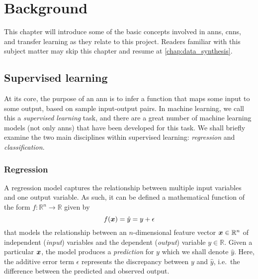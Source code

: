 \documentclass[../report.tex]{subfiles}
\begin{document}
\chapter{Background}
This chapter will introduce some of the basic concepts involved in \glspl{ann}, \glspl{cnn}, and transfer learning as they relate to this project.
Readers familiar with this subject matter may skip this chapter and resume at \cref{chap:data_synthesis}.

\section{Supervised learning}
At its core, the purpose of an \gls{ann} is to infer a function that maps some input to some output, based on sample input-output pairs.
In machine learning, we call this a \emph{supervised learning} task, and there are a great number of machine learning models (not only \glspl{ann}) that have been developed for this task.
We shall briefly examine the two main disciplines within supervised learning: \emph{regression} and \emph{classification}.

\subsection{Regression}
\label{sec:regression}
A regression model captures the relationship between multiple input variables and one output variable. 
As such, it can be defined a mathematical function of the form $f:\mathbb{R}^n\rightarrow \mathbb{R}$ given by
\begin{equation}
    \label{eq:reg_model}
    f({\bm{x}}) = \hat{y} = y + \epsilon
\end{equation}
that models the relationship between an $n$-dimensional feature vector ${\bm{x}} \in \mathbb{R}^n$ of independent (\emph{input}) variables and the dependent (\emph{output}) variable $y \in \mathbb{R}$. 
Given a particular ${\bm{x}}$, the model produces a \emph{prediction} for $y$ which we shall denote $\hat{y}$.
Here, the additive error term $\epsilon$ represents the discrepancy between $y$ and $\hat{y}$, i.e.\ the difference between the predicted and observed output.
\end{document}
